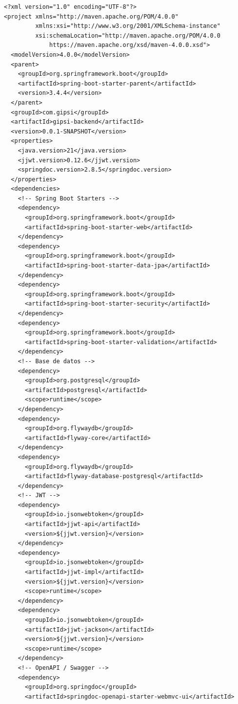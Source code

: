 \documentclass[12pt,a4paper,twoside]{report}
\begin{document}
\begin{lstlisting}[style=yamlStyle, caption={pom.xml del proyecto Gipsi-API}, label={lst:pom}]
<?xml version="1.0" encoding="UTF-8"?>
<project xmlns="http://maven.apache.org/POM/4.0.0"
         xmlns:xsi="http://www.w3.org/2001/XMLSchema-instance"
         xsi:schemaLocation="http://maven.apache.org/POM/4.0.0
             https://maven.apache.org/xsd/maven-4.0.0.xsd">
  <modelVersion>4.0.0</modelVersion>
  <parent>
    <groupId>org.springframework.boot</groupId>
    <artifactId>spring-boot-starter-parent</artifactId>
    <version>3.4.4</version>
  </parent>
  <groupId>com.gipsi</groupId>
  <artifactId>gipsi-backend</artifactId>
  <version>0.0.1-SNAPSHOT</version>
  <properties>
    <java.version>21</java.version>
    <jjwt.version>0.12.6</jjwt.version>
    <springdoc.version>2.8.5</springdoc.version>
  </properties>
  <dependencies>
    <!-- Spring Boot Starters -->
    <dependency>
      <groupId>org.springframework.boot</groupId>
      <artifactId>spring-boot-starter-web</artifactId>
    </dependency>
    <dependency>
      <groupId>org.springframework.boot</groupId>
      <artifactId>spring-boot-starter-data-jpa</artifactId>
    </dependency>
    <dependency>
      <groupId>org.springframework.boot</groupId>
      <artifactId>spring-boot-starter-security</artifactId>
    </dependency>
    <dependency>
      <groupId>org.springframework.boot</groupId>
      <artifactId>spring-boot-starter-validation</artifactId>
    </dependency>
    <!-- Base de datos -->
    <dependency>
      <groupId>org.postgresql</groupId>
      <artifactId>postgresql</artifactId>
      <scope>runtime</scope>
    </dependency>
    <dependency>
      <groupId>org.flywaydb</groupId>
      <artifactId>flyway-core</artifactId>
    </dependency>
    <dependency>
      <groupId>org.flywaydb</groupId>
      <artifactId>flyway-database-postgresql</artifactId>
    </dependency>
    <!-- JWT -->
    <dependency>
      <groupId>io.jsonwebtoken</groupId>
      <artifactId>jjwt-api</artifactId>
      <version>${jjwt.version}</version>
    </dependency>
    <dependency>
      <groupId>io.jsonwebtoken</groupId>
      <artifactId>jjwt-impl</artifactId>
      <version>${jjwt.version}</version>
      <scope>runtime</scope>
    </dependency>
    <dependency>
      <groupId>io.jsonwebtoken</groupId>
      <artifactId>jjwt-jackson</artifactId>
      <version>${jjwt.version}</version>
      <scope>runtime</scope>
    </dependency>
    <!-- OpenAPI / Swagger -->
    <dependency>
      <groupId>org.springdoc</groupId>
      <artifactId>springdoc-openapi-starter-webmvc-ui</artifactId>

\end{lstlisting}
\end{document}
